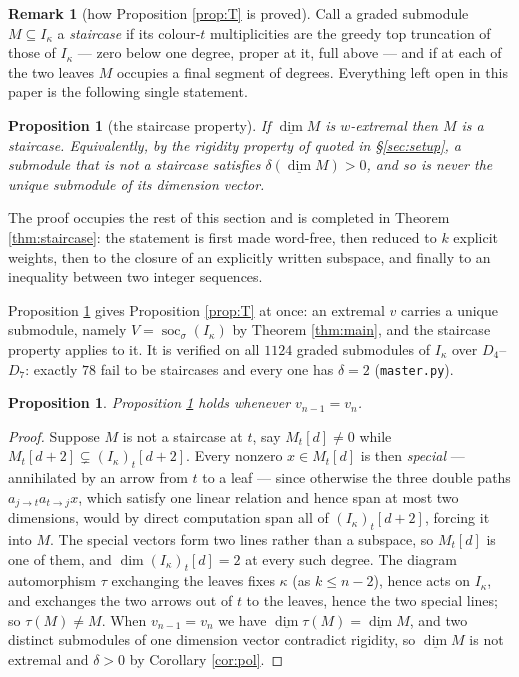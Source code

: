 \documentclass[11pt,reqno]{amsart}
\theoremstyle{plain}
\newtheorem{proposition}[theorem]{Proposition}
\theoremstyle{definition}
\newtheorem{remark}[theorem]{Remark}
\DeclareMathOperator{\soc}{soc}
\newcommand{\dimv}{\underline{\dim}}
\newcommand{\ka}{\kappa}
\begin{document}
\begin{remark}[how Proposition \ref{prop:T} is proved]\label{rem:Tk3}
Call a graded submodule $M\subseteq I_\ka$ a \emph{staircase} if its colour-$t$
multiplicities are the greedy top truncation of those of $I_\ka$ --- zero below
one degree, proper at it, full above --- and if at each of the two leaves $M$
occupies a final segment of degrees.  Everything left open in this paper is the
following single statement.

\begin{proposition}[the staircase property]\label{conj:staircase}
If $\dimv M$ is $w$-extremal then $M$ is a staircase.  Equivalently, by the
rigidity property of \cite{BKT} quoted in \S\ref{sec:setup}, a submodule that
is not a staircase satisfies $\delta(\dimv M)>0$, and so is never the unique
submodule of its dimension vector.
\end{proposition}

\noindent The proof occupies the rest of this section and is completed in
Theorem \ref{thm:staircase}: the statement is first made word-free, then reduced
to $k$ explicit weights, then to the closure of an explicitly written subspace,
and finally to an inequality between two integer sequences.

Proposition \ref{conj:staircase} gives Proposition \ref{prop:T} at once: an
extremal $v$ carries a unique submodule, namely $V=\soc_\sigma(I_\ka)$ by
Theorem \ref{thm:main}, and the staircase property applies to it.  It is
verified on all $1124$ graded submodules of $I_\ka$ over $D_4$--$D_7$: exactly
$78$ fail to be staircases and every one has $\delta=2$
(\texttt{master.py}).

\begin{proposition}\label{prop:tau}
Proposition \ref{conj:staircase} holds whenever $v_{n-1}=v_n$.
\end{proposition}

\begin{proof}
Suppose $M$ is not a staircase at $t$, say $M_t[d]\ne0$ while
$M_t[d+2]\subsetneq (I_\ka)_t[d+2]$.  Every nonzero $x\in M_t[d]$ is then
\emph{special} --- annihilated by an arrow from $t$ to a leaf --- since
otherwise the three double paths $a_{j\to t}a_{t\to j}x$, which satisfy one
linear relation and hence span at most two dimensions, would by direct
computation span all of $(I_\ka)_t[d+2]$, forcing it into $M$.  The special
vectors form two lines rather than a subspace, so $M_t[d]$ is one of them, and
$\dim (I_\ka)_t[d]=2$ at every such degree.  The diagram automorphism $\tau$
exchanging the leaves fixes $\ka$ (as $k\le n-2$), hence acts on $I_\ka$, and
exchanges the two arrows out of $t$ to the leaves, hence the two special lines;
so $\tau(M)\ne M$.  When $v_{n-1}=v_n$ we have $\dimv\tau(M)=\dimv M$, and two
distinct submodules of one dimension vector contradict rigidity, so $\dimv M$
is not extremal and $\delta>0$ by Corollary \ref{cor:pol}.
\end{proof}


\end{remark}
\end{document}
